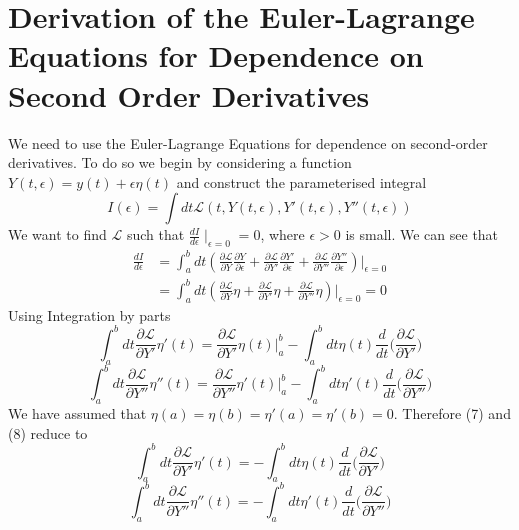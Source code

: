 \documentclass[11pt]{report}
\numberwithin{equation}{chapter}
\begin{document}
\chapter{Derivation of the Euler-Lagrange Equations for Dependence on Second Order Derivatives}
We need to use the Euler-Lagrange Equations for dependence on second-order derivatives. To do so we begin by considering a function $Y(t,\epsilon)=y(t)+ \epsilon\eta(t)$ and construct the parameterised integral
\begin{equation}
    I(\epsilon) = \int dt \mathcal{L}(t,Y(t,\epsilon),Y'(t,\epsilon),Y''(t,\epsilon))
\end{equation}
We want to find $\mathcal{L}$ such that $\frac{dI}{d\epsilon}\mid_{\epsilon=0}=0$, where $\epsilon >0$ is small. We can see that
\begin{equation}
    \begin{aligned}
     \frac{dI}{d\epsilon} &= \int_a^b dt \left(\frac{\partial\mathcal{L}}{\partial Y}\frac{\partial Y}{\partial \epsilon}+\frac{\partial\mathcal{L}}{\partial Y'}\frac{\partial Y'}{\partial \epsilon}+\frac{\partial \mathcal{L}}{\partial Y''}\frac{\partial Y''}{\partial \epsilon}\right) \bigg|_{\epsilon =0}\\
     &= \int_a^b dt \left(\frac{\partial\mathcal{L}}{\partial Y}\eta +\frac{\partial\mathcal{L}}{\partial Y'}\eta +\frac{\partial \mathcal{L}}{\partial Y''}\eta\right)\bigg|_{\epsilon =0} =0
   \end{aligned}
\end{equation}
Using Integration by parts
\begin{equation}
    \int_a^b dt \frac{\partial\mathcal{L}}{\partial Y'}\eta'(t) = \frac{\partial\mathcal{L}}{\partial Y'}\eta(t)\bigg|_a^b-\int_a^b dt \eta(t) \frac{d}{dt}\bigg(\frac{\partial\mathcal{L}}{\partial Y'}\bigg)
\end{equation}
\begin{equation}
    \int_a^b dt \frac{\partial\mathcal{L}}{\partial Y''}\eta''(t) = \frac{\partial\mathcal{L}}{\partial Y''}\eta'(t)\bigg|_a^b-\int_a^b dt \eta'(t) \frac{d}{dt}\bigg(\frac{\partial\mathcal{L}}{\partial Y''}\bigg)
\end{equation}
We have assumed that  $\eta(a)=\eta(b)=\eta'(a)=\eta'(b)=0$. Therefore (7) and (8) reduce to 
\begin{equation}
    \int_a^b dt \frac{\partial\mathcal{L}}{\partial Y'}\eta'(t) = -\int_a^b dt \eta(t) \frac{d}{dt}\bigg(\frac{\partial\mathcal{L}}{\partial Y'}\bigg)
\end{equation}
\begin{equation}
    \int_a^b dt \frac{\partial\mathcal{L}}{\partial Y''}\eta''(t) = -\int_a^b dt \eta'(t) \frac{d}{dt}\bigg(\frac{\partial\mathcal{L}}{\partial Y''}\bigg)
\end{equation}
\end{document}
